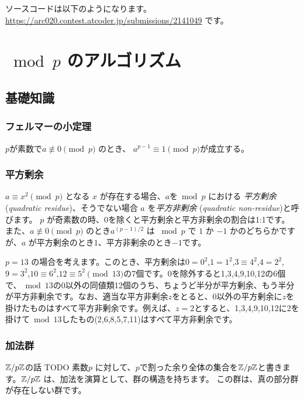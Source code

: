 \documentclass{jsarticle}
\begin{document}
  ソースコードは以下のようになります。\url{https://arc020.contest.atcoder.jp/submissions/2141049} です。
  
 \section{${}\bmod p$ のアルゴリズム}
  \subsection{基礎知識}
  \label{subsec:group-preliminaries}
   \subsubsection{フェルマーの小定理}
   \begin{theorem}
    \label{thm:fermats-little-theorem}
    $p$が素数で$a \not \equiv 0 \pmod p$ のとき、 $a^{p-1} \equiv 1 \pmod p$が成立する。
   \end{theorem}
   \subsubsection{平方剰余}
   \label{subsubsec:quadratic-residue}
   $a \equiv x^2 \pmod p$ となる $x$ が存在する場合、$a$を${}\bmod p$ における \emph{平方剰余} (\emph{quadratic residue})、そうでない場合 $a$ を\emph{平方非剰余} (\emph{quadratic non-residue})と呼びます。
   $p$ が奇素数の時、0を除くと平方剰余と平方非剰余の割合は1:1です。
   また、$a\not\equiv 0 \pmod p$ のとき$a^{(p-1)/2}$ は ${}\bmod p$ で $1$ か $-1$ かのどちらかですが、$a$ が平方剰余のとき$1$、平方非剰余のとき$-1$です。
   \begin{example}
    $p = 13$ の場合を考えます。このとき、平方剰余は$0=0^2$,$1=1^2$,$3\equiv 4^2$,$4=2^2$,$9=3^2$,$10\equiv 6^2$,$12 \equiv 5^2 \pmod{13}$の7個です。0を除外すると1,3,4,9,10,12の6個で、${}\bmod 13$の0以外の同値類12個のうち、ちょうど半分が平方剰余、もう半分が平方非剰余です。なお、適当な平方非剰余$z$をとると、0以外の平方剰余に$z$を掛けたものはすべて平方非剰余です。例えば、$z=2$とすると、1,3,4,9,10,12に2を掛けて${}\bmod 13$したもの(2,6,8,5,7,11)はすべて平方非剰余です。
   \end{example}
   \subsubsection{加法群}
   $\mathbb{Z}/p\mathbb{Z}$の話 TODO
   素数$p$ に対して、$p$で割った余り全体の集合を$\mathbb{Z}/p\mathbb{Z}$と書きます。$\mathbb{Z}/p\mathbb{Z}$ は、加法を演算として、群の構造を持ちます。
   この群は、真の部分群が存在しない群です。
\end{document}
